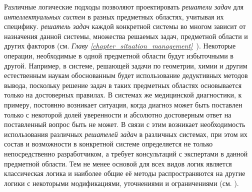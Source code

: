 Различные логические подходы позволяют проектировать \textit{решатели задач} для \textit{интеллектуальных систем} в разных предметных областях, учитывая их специфику. \textit{решатель задач} каждой конкретной системы во многом зависит от назначения данной системы, множества решаемых задач, предметной области и других факторов (см. \textit{Главу \ref{chapter_situation_management}~}). Некоторые операции, необходимые в одной предметной области будут избыточными в другой. Например, в системе, решающей задачи по геометрии, химии и другим естественным наукам обоснованным будет использование дедуктивных методов вывода, поскольку решение задач в таких предметных областях основывается только на достоверных правилах. В системах же медицинской диагностики, к примеру, постоянно возникает ситуация, когда диагноз может быть поставлен только с некоторой долей уверенности и абсолютно достоверным ответ на поставленный вопрос быть не может. В связи с этим возникает необходимость использования различных \textit{решателей задач} в различных системах, при этом их состав и возможности в конкретной системе определяется не только непосредственно разработчиком, а требует консультаций с экспертами в данной предметной области. Тем не менее основой для всех видов логик является классическая логика и наиболее общие её методы распространяются на другие логики с некоторыми модификациями, уточнениями и ограничениями (см. ).

